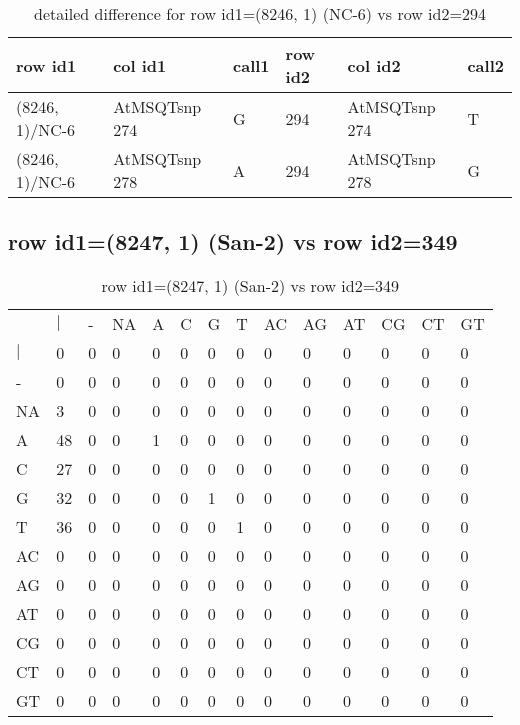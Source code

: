 \begin{center}
\begin{longtable}{|l|l|l|l|l|l|}
\caption{detailed difference for row id1=(8246, 1) (NC-6) vs row id2=294} \label{table_dm183}\\
\hline
row id1&col id1&call1&row id2&col id2&call2\\
\hline
(8246, 1)/NC-6&AtMSQTsnp 274&G&294&AtMSQTsnp 274&T\\
(8246, 1)/NC-6&AtMSQTsnp 278&A&294&AtMSQTsnp 278&G\\
\hline
\end{longtable}
\end{center}

\subsection{row id1=(8247, 1) (San-2) vs row id2=349}
\begin{center}
\begin{longtable}{|l|l|l|l|l|l|l|l|l|l|l|l|l|l|}
\caption{row id1=(8247, 1) (San-2) vs row id2=349} \label{table_dm184}\\
\hline
\\
\hline
&$|$&-&NA&A&C&G&T&AC&AG&AT&CG&CT&GT\\
$|$&0&0&0&0&0&0&0&0&0&0&0&0&0\\
-&0&0&0&0&0&0&0&0&0&0&0&0&0\\
NA&3&0&0&0&0&0&0&0&0&0&0&0&0\\
A&48&0&0&1&0&0&0&0&0&0&0&0&0\\
C&27&0&0&0&0&0&0&0&0&0&0&0&0\\
G&32&0&0&0&0&1&0&0&0&0&0&0&0\\
T&36&0&0&0&0&0&1&0&0&0&0&0&0\\
AC&0&0&0&0&0&0&0&0&0&0&0&0&0\\
AG&0&0&0&0&0&0&0&0&0&0&0&0&0\\
AT&0&0&0&0&0&0&0&0&0&0&0&0&0\\
CG&0&0&0&0&0&0&0&0&0&0&0&0&0\\
CT&0&0&0&0&0&0&0&0&0&0&0&0&0\\
GT&0&0&0&0&0&0&0&0&0&0&0&0&0\\
\hline
\end{longtable}
\end{center}

